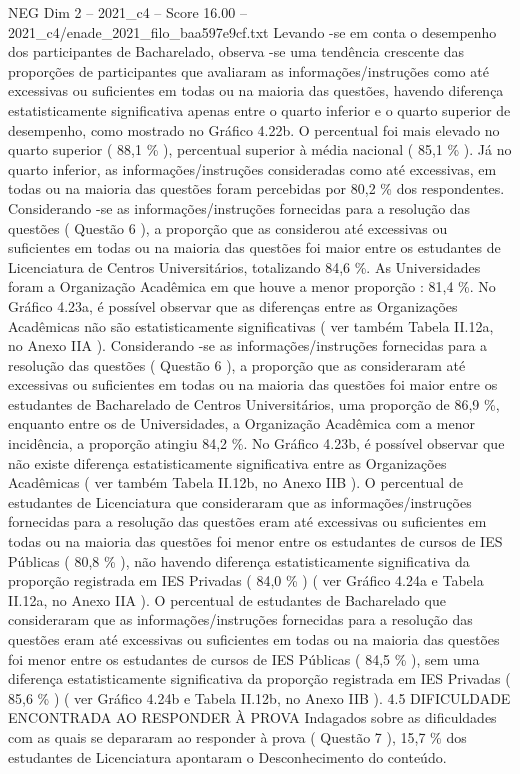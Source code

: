 \begin{textsample}{NEG Dim 2 – 2021\_c4 – Score 16.00 – 2021\_c4/enade\_2021\_filo\_baa597e9cf.txt}
Levando -se em conta o desempenho dos participantes de Bacharelado, observa -se uma tendência crescente das proporções de participantes que avaliaram as informações/instruções como até excessivas ou suficientes em todas ou na maioria das questões, havendo diferença estatisticamente significativa apenas entre o quarto inferior e o quarto superior de desempenho, como mostrado no Gráfico 4.22b.
O percentual foi mais elevado no quarto superior ( 88,1 \% ), percentual superior à média nacional ( 85,1 \% ).
Já no quarto inferior, as informações/instruções consideradas como até excessivas, em todas ou na maioria das questões foram percebidas por 80,2 \% dos respondentes.
Considerando -se as informações/instruções fornecidas para a resolução das questões ( Questão 6 ), a proporção que as considerou até excessivas ou suficientes em todas ou na maioria das questões foi maior entre os estudantes de Licenciatura de Centros Universitários, totalizando 84,6 \%.
As Universidades foram a Organização Acadêmica em que houve a menor proporção : 81,4 \%.
No Gráfico 4.23a, é possível observar que as diferenças entre as Organizações Acadêmicas não são estatisticamente significativas ( ver também Tabela II.12a, no Anexo IIA ).
Considerando -se as informações/instruções fornecidas para a resolução das questões ( Questão 6 ), a proporção que as consideraram até excessivas ou suficientes em todas ou na maioria das questões foi maior entre os estudantes de Bacharelado de Centros Universitários, uma proporção de 86,9 \%, enquanto entre os de Universidades, a Organização Acadêmica com a menor incidência, a proporção atingiu 84,2 \%.
No Gráfico 4.23b, é possível observar que não existe diferença estatisticamente significativa entre as Organizações Acadêmicas ( ver também Tabela II.12b, no Anexo IIB ).
O percentual de estudantes de Licenciatura que consideraram que as informações/instruções fornecidas para a resolução das questões eram até excessivas ou suficientes em todas ou na maioria das questões foi menor entre os estudantes de cursos de IES Públicas ( 80,8 \% ), não havendo diferença estatisticamente significativa da proporção registrada em IES Privadas ( 84,0 \% ) ( ver Gráfico 4.24a e Tabela II.12a, no Anexo IIA ).
O percentual de estudantes de Bacharelado que consideraram que as informações/instruções fornecidas para a resolução das questões eram até excessivas ou suficientes em todas ou na maioria das questões foi menor entre os estudantes de cursos de IES Públicas ( 84,5 \% ), sem uma diferença estatisticamente significativa da proporção registrada em IES Privadas ( 85,6 \% ) ( ver Gráfico 4.24b e Tabela II.12b, no Anexo IIB ). 4.5 DIFICULDADE ENCONTRADA AO RESPONDER À PROVA Indagados sobre as dificuldades com as quais se depararam ao responder à prova ( Questão 7 ), 15,7 \% dos estudantes de Licenciatura apontaram o Desconhecimento do conteúdo.

\end{textsample}
